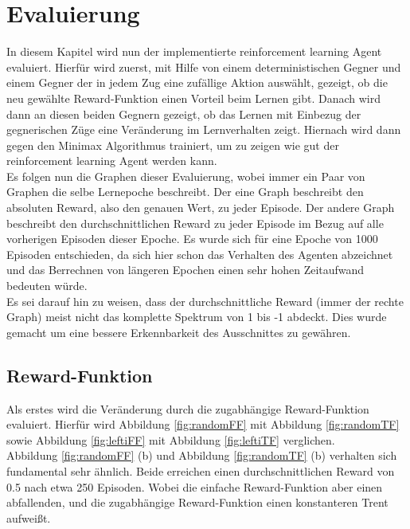 \chapter{Evaluierung}%

\label{cha:Eval}

In diesem Kapitel wird nun der implementierte reinforcement learning Agent evaluiert. Hierfür wird zuerst, mit Hilfe von einem deterministischen Gegner und einem Gegner der in jedem Zug eine zufällige Aktion auswählt, gezeigt, ob die neu gewählte Reward-Funktion einen Vorteil beim Lernen gibt. Danach wird dann an diesen beiden Gegnern gezeigt, ob das Lernen mit Einbezug der gegnerischen Züge eine Veränderung im Lernverhalten zeigt. Hiernach wird dann gegen den Minimax Algorithmus trainiert, um zu zeigen wie gut der reinforcement learning Agent werden kann. \\Es folgen nun die Graphen dieser Evaluierung, wobei immer ein Paar von Graphen die selbe Lernepoche beschreibt. Der eine Graph beschreibt den absoluten Reward, also den genauen Wert, zu jeder Episode. Der andere Graph beschreibt den durchschnittlichen Reward zu jeder Episode im Bezug auf alle vorherigen Episoden dieser Epoche.
Es wurde sich für eine Epoche von 1000 Episoden entschieden, da sich hier schon das Verhalten des Agenten abzeichnet und das Berrechnen von längeren Epochen einen sehr hohen Zeitaufwand bedeuten würde.\\

Es sei darauf hin zu weisen, dass der durchschnittliche Reward (immer der rechte Graph) meist nicht das komplette Spektrum von 1 bis -1 abdeckt. Dies wurde gemacht um eine bessere Erkennbarkeit des Ausschnittes zu gewähren.

\section{Reward-Funktion}
Als erstes wird die Veränderung durch die zugabhängige Reward-Funktion evaluiert. Hierfür wird Abbildung \ref{fig:randomFF} mit Abbildung \ref{fig:randomTF} sowie Abbildung \ref{fig:leftiFF} mit Abbildung \ref{fig:leftiTF} verglichen.\\
Abbildung \ref{fig:randomFF} (b) und Abbildung \ref{fig:randomTF} (b) verhalten sich fundamental sehr ähnlich. Beide erreichen einen durchschnittlichen Reward von 0.5 nach etwa 250 Episoden. Wobei die einfache Reward-Funktion aber einen abfallenden, und die zugabhängige Reward-Funktion einen konstanteren Trent aufweißt.\\

